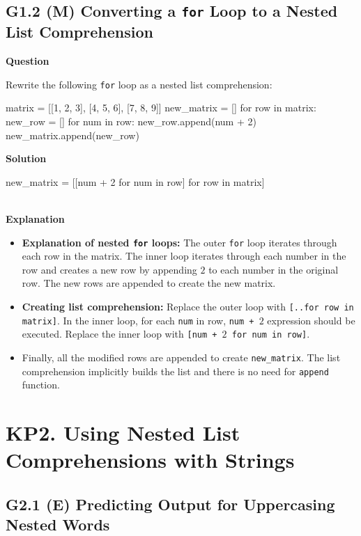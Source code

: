 \documentclass[10pt]{extarticle}
\begin{document}
\subsection*{G1.2 (M) Converting a \texttt{for} Loop to a Nested List Comprehension}

\textbf{Question}

Rewrite the following \texttt{for} loop as a nested list comprehension:  

    \begin{python}
    matrix = [[1, 2, 3], [4, 5, 6], [7, 8, 9]]
    new_matrix = []
    for row in matrix:
        new_row = []
        for num in row:
            new_row.append(num + 2)
        new_matrix.append(new_row)
    \end{python}

\noindent\textbf{Solution}

\begin{python}
new_matrix = [[num + 2 for num in row] for row in matrix]
\end{python}  \\

\noindent\textbf{Explanation}

\begin{itemize}
    \item \textbf{Explanation of nested \texttt{for} loops:} The outer \texttt{for} loop iterates through each row in the matrix.
    The inner loop iterates through each number in the row and creates a new row by appending $2$ to each number in the original row.
    The new rows are appended to create the new matrix. 
    \item \textbf{Creating list comprehension:} Replace the outer loop with \colorbox{gray!20}{\texttt{[..for row in matrix]}}. In the inner loop, for each \texttt{num} in row,  \colorbox{gray!20}{\texttt{num + $2$}} expression should be executed. Replace the inner loop  with \colorbox{gray!20}{\texttt{[num + $2$ for num in row]}}.
    \item Finally, all the modified rows are appended to create \texttt{new\_matrix}. The list comprehension implicitly builds the list and there is no need for  \colorbox{gray!20}{\texttt{append}} function.
   
   
\end{itemize}
\section*{KP2. Using Nested List Comprehensions with Strings}
\subsection*{G2.1 (E) Predicting Output for Uppercasing Nested Words}
\end{document}
